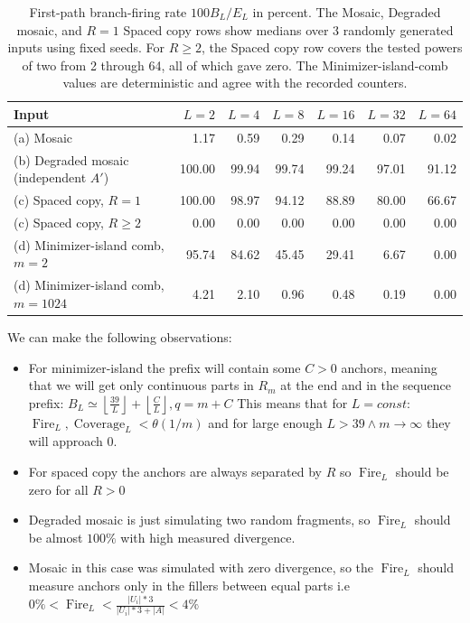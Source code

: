 \begin{table}[H]
\centering
\caption{First-path branch-firing rate \(100B_L/E_L\) in percent.
The Mosaic, Degraded mosaic, and \(R=1\) Spaced copy rows show medians over 3 randomly
generated inputs using fixed seeds. For \(R\geq2\), the Spaced copy row covers the tested
powers of two from 2 through 64, all of which gave zero. The Minimizer-island-comb
values are deterministic and agree with the recorded counters.}
\label{tab:chaining-runl-firing}
\scriptsize
\setlength{\tabcolsep}{3.2pt}
\begin{tabular}{lrrrrrr}
\toprule
Input & \(L=2\) & \(L=4\) & \(L=8\) & \(L=16\) & \(L=32\) & \(L=64\) \\
\midrule
(a) Mosaic                     &   1.17 &  0.59 &  0.29 &  0.14 &  0.07 &  0.02 \\
(b) Degraded mosaic (independent \(A'\)) & 100.00 & 99.94 & 99.74 & 99.24 & 97.01 & 91.12 \\
(c) Spaced copy, \(R=1\)       & 100.00 & 98.97 & 94.12 & 88.89 & 80.00 & 66.67 \\
(c) Spaced copy, \(R\geq2\)   &   0.00 &  0.00 &  0.00 &  0.00 &  0.00 &  0.00 \\
(d) Minimizer-island comb, \(m=2\)    & 95.74 & 84.62 & 45.45 & 29.41 & 6.67 & 0.00 \\
(d) Minimizer-island comb, \(m=1024\) &  4.21 &  2.10 &  0.96 &  0.48 & 0.19 & 0.00 \\
\bottomrule
\end{tabular}
\end{table}

We can make the following observations:
\begin{itemize}
  \item For minimizer-island the prefix will contain some $C > 0$ anchors, meaning that we will get only continuous parts in $R_m$ at the end and in the sequence prefix: $B_L \simeq \left\lfloor\frac{39}{L}\right\rfloor + \left\lfloor\frac{C}{L}\right\rfloor, q = m + C$
  This means that for $L = const:$ $\operatorname{Fire}_L, \operatorname{Coverage}_L < \theta(1/m)$ and for large enough $L > 39 \land m \rightarrow \infty$ they will approach $0$.
  \item For spaced copy the anchors are always separated by $R$ so $\operatorname{Fire}_L$ should be zero for all $R > 0$
  \item Degraded mosaic is just simulating two random fragments, so $\operatorname{Fire}_L$ should be almost $100\%$ with high measured divergence.
  \item Mosaic in this case was simulated with zero divergence, so the $\operatorname{Fire}_L$ should measure anchors only in the fillers between equal parts i.e $0\% < \operatorname{Fire}_L < \frac{|U_i|*3}{|U_i|*3+|A|} < 4\%$
\end{itemize}

